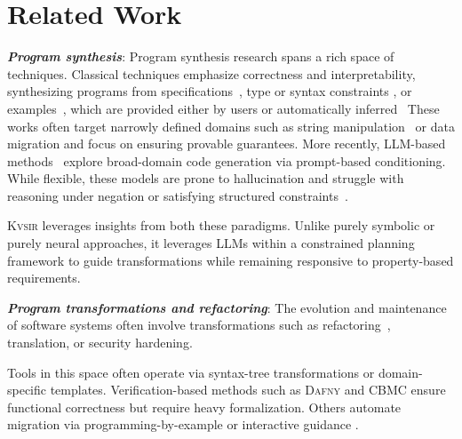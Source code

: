 \documentclass[sigplan,review,anonymous,10pt]{acmart}
\newcommand{\sys}{{\scshape Kv{\textalpha}sir}\xspace}
\newcommand{\heading}[1]{\vspace{2pt}\noindent\textbf{\emph{#1}}:\enspace}
\begin{document}

\section{Related Work}

\heading{Program synthesis}
Program synthesis research spans a rich space of techniques.
Classical techniques emphasize correctness and
interpretability, synthesizing programs from specifications~\cite{alur2013syntax, feser2015synthesizing, gulwani2011automating,leino2016dafny},
type or syntax constraints \cite{polikarpova2016program,reynolds2019syguscomp},
or examples~\cite{jha2010oracle, raza2018disjunctive, singh2016blinkfill,wu2023programming},
which are provided either by users or automatically inferred~\cite{cambronero2019active,harp:ccs:2021}
These works often target narrowly
defined domains such as string manipulation~\cite{harp:ccs:2021} or data migration
\cite{yaghmazadeh2018automated} and focus on ensuring provable guarantees.
More recently, LLM-based methods~\cite{austin2021program, chen2021evaluating}
explore broad-domain code generation via prompt-based conditioning.
While flexible, these models are prone to hallucination and struggle
with reasoning under negation or satisfying structured constraints~\cite{xu2023llmfoolitselfpromptbased, wu2023deceptpromptexploitingllmdrivencode,jiang2024llmsdreamelephantswhen,hwang2024thinkpinkelephant}.

\sys leverages insights from both these paradigms.
Unlike purely symbolic or purely neural approaches, it leverages LLMs within a
constrained planning framework to guide transformations while remaining
responsive to property-based requirements.

\heading{Program transformations and refactoring}
The evolution and maintenance of software systems often involve transformations
such as refactoring~\cite{Fowler99,Mens04,Myers16}, translation, or security hardening. %

Tools in this space often operate via syntax-tree transformations or
domain-specific templates. Verification-based methods such as \textsc{Dafny}
\cite{leino2016dafny} and \textsc{CBMC} \cite{Clarke04} ensure functional correctness
but require heavy formalization.
Others automate migration via
programming-by-example or interactive guidance \cite{gulwani2017program, le2017interactive}.
\end{document}
